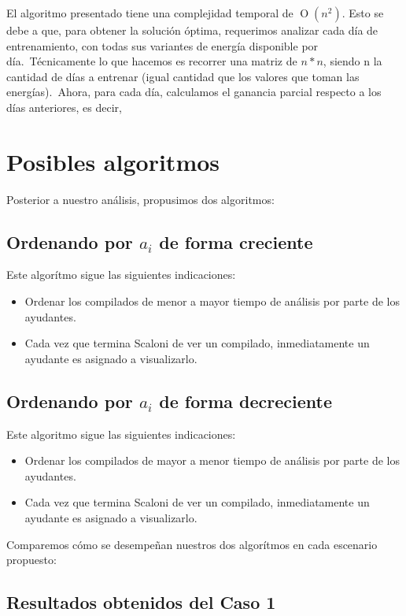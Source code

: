 El algoritmo presentado tiene una complejidad temporal de $\operatorname{O}(n^2)$.
Esto se debe a que, para obtener la solución óptima, requerimos analizar cada día de entrenamiento, con todas sus
variantes de energía disponible por día.\
Técnicamente lo que hacemos es recorrer una matriz de $n*n$, siendo n la cantidad de días a entrenar (igual cantidad que
los valores que toman las energías).\
Ahora, para cada día, calculamos el ganancia parcial respecto a los días anteriores, es decir,



\section{Posibles algoritmos}

Posterior a nuestro análisis, propusimos dos algoritmos:

\subsection{Ordenando por $a_i$ de forma creciente}
Este algorítmo sigue las siguientes indicaciones:
\begin{itemize}
    \item Ordenar los compilados de menor a mayor tiempo de análisis por parte de los ayudantes.
    \item Cada vez que termina Scaloni de ver un compilado, inmediatamente un ayudante es asignado a visualizarlo.
\end{itemize}

\subsection{Ordenando por $a_i$ de forma decreciente}
Este algoritmo sigue las siguientes indicaciones:
\begin{itemize}
    \item Ordenar los compilados de mayor a menor tiempo de análisis por parte de los ayudantes.
    \item Cada vez que termina Scaloni de ver un compilado, inmediatamente un ayudante es asignado a visualizarlo.
\end{itemize}

Comparemos cómo se desempeñan nuestros dos algorítmos en cada escenario propuesto:

\subsection{Resultados obtenidos del Caso 1}

